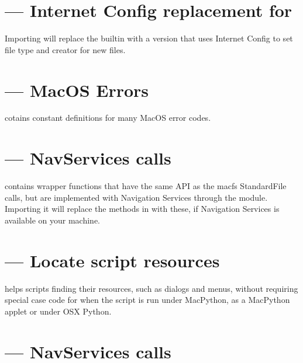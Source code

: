 \section{ --- Internet Config replacement for }

Importing  will replace the builtin 
with a version that uses Internet Config to set file type and creator
for new files.


\section{ --- MacOS Errors}

 cotains constant definitions for many MacOS error codes.


\section{ --- NavServices calls}


 contains wrapper functions that have the same API as the macfs 
StandardFile calls, but are implemented with Navigation Services through the
 module. Importing it 
will replace the methods in  with these,
if Navigation Services is 
available on your machine.


\section{ --- Locate script resources}

 helps scripts finding their resources, such as
dialogs and menus, without requiring special case code for when the
script is run under MacPython, as a MacPython applet or under OSX Python.

\section{ --- NavServices calls}

